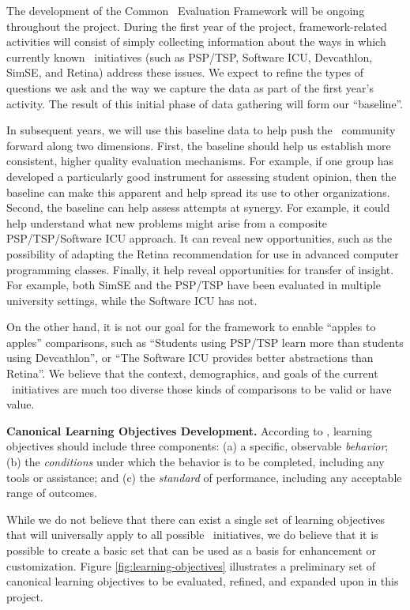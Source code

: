 The development of the Common \eCT\ Evaluation Framework will be ongoing
throughout the project.  During the first year of the project,
framework-related activities will consist of simply collecting information
about the ways in which currently known \eCT\ initiatives (such as PSP/TSP,
Software ICU, Devcathlon, SimSE, and Retina) address these issues.   We expect to 
refine the types of questions we ask and the way we capture the data as
part of the first year's activity. The result of this initial phase of data
gathering will form our ``baseline''. 

In subsequent years, we will use this baseline data to help push the \eCT\
community forward along two dimensions. First, the baseline should help us
establish more consistent, higher quality evaluation mechanisms. For
example, if one group has developed a particularly good instrument for
assessing student opinion, then the baseline can make this apparent and
help spread its use to other organizations.  Second, the baseline can
help assess attempts at synergy.  For example, it could help understand what 
new problems might arise from a composite PSP/TSP/Software ICU approach. 
It can reveal new opportunities, such as the possibility of adapting the 
Retina recommendation for use in advanced computer programming classes. 
Finally, it help reveal opportunities for transfer of insight. For example, 
both SimSE and the PSP/TSP have been evaluated in multiple university settings, 
while the Software ICU has not. 

On the other hand, it is not our goal for the framework to enable ``apples
to apples'' comparisons, such as ``Students using PSP/TSP learn more than
students using Devcathlon'', or ``The Software ICU provides better abstractions
than Retina''.  We believe that the context, demographics, and goals of the
current \eCT\ initiatives are much too diverse those kinds of comparisons
to be valid or have value.

{\bf Canonical Learning Objectives Development.}  According to
\cite{Mager62}, learning objectives should include three components: (a) a
specific, observable {\em behavior}; (b) the {\em conditions} under which
the behavior is to be completed, including any tools or assistance; and (c)
the {\em standard} of performance, including any acceptable range of
outcomes.

While we do not believe that there can exist a single set of learning
objectives that will universally apply to all possible \eCT\ initiatives,
we do believe that it is possible to create a basic set that can be used as
a basis for enhancement or customization.  Figure
\ref{fig:learning-objectives} illustrates a preliminary set of canonical
learning objectives to be evaluated, refined, and expanded upon in this project. 

